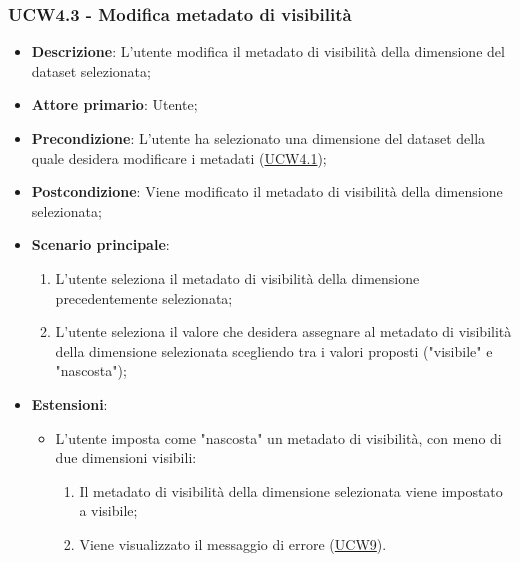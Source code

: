 \subsubsection{UCW4.3 - Modifica metadato di visibilità}
\label{ssub:ucw4.3}

\begin{itemize}
    \item \textbf{Descrizione}: L’utente modifica il metadato di visibilità della dimensione del dataset selezionata;

    \item \textbf{Attore primario}: Utente;

    \item \textbf{Precondizione}:   L'utente ha selezionato una dimensione del dataset della quale desidera modificare
          i metadati (\hyperref[ssub:ucw4.1]{UCW4.1});

    \item \textbf{Postcondizione}:  Viene modificato il metadato di visibilità della dimensione selezionata;

    \item \textbf{Scenario principale}:
          \begin{enumerate}
              \item L'utente seleziona il metadato di visibilità della dimensione precedentemente selezionata;
              \item L'utente seleziona il valore che desidera assegnare al metadato di visibilità della dimensione
                    selezionata scegliendo tra i valori proposti ("visibile" e "nascosta");
          \end{enumerate}

    \item \textbf{Estensioni}:
          \begin{itemize}
              \item L'utente imposta come "nascosta" un metadato di visibilità, con meno di due dimensioni visibili:
                    \begin{enumerate}
                        \item Il metadato di visibilità della dimensione selezionata viene impostato a
                              visibile;
                        \item Viene visualizzato il messaggio di errore (\hyperref[sub:ucw9]{UCW9}).
                    \end{enumerate}
          \end{itemize}
\end{itemize}